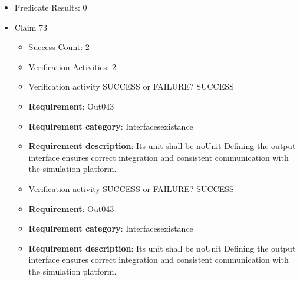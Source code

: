\documentclass{article}
\begin{document}
\begin{itemize}
\begin{itemize}
						\item \textbf{Requirement}: Out042 
						\item \textbf{Requirement category}: Interfacesexistance 
						\item \textbf{Requirement description}: Its unit shall be noUnit Defining the output interface ensures correct integration and consistent communication with the simulation platform.
					
					\item Verification activity SUCCESS or FAILURE? FAILURE
		
						\item \textbf{Requirement}: Out042 
						\item \textbf{Requirement category}: Interfacesexistance 
						\item \textbf{Requirement description}: Its unit shall be noUnit Defining the output interface ensures correct integration and consistent communication with the simulation platform.
					
				\end{itemize}
				
									    
				\item Predicate Results: 0

  				  \item Claim 73
				\begin{itemize}
			    	\item Success Count: 2 
			    	\item Verification Activities: 2
					\item Verification activity SUCCESS or FAILURE? SUCCESS
		
						\item \textbf{Requirement}: Out043 
						\item \textbf{Requirement category}: Interfacesexistance 
						\item \textbf{Requirement description}: Its unit shall be noUnit Defining the output interface ensures correct integration and consistent communication with the simulation platform.
					
					\item Verification activity SUCCESS or FAILURE? SUCCESS
		
						\item \textbf{Requirement}: Out043 
						\item \textbf{Requirement category}: Interfacesexistance 
						\item \textbf{Requirement description}: Its unit shall be noUnit Defining the output interface ensures correct integration and consistent communication with the simulation platform.
					

\end{itemize}
\end{itemize}
\end{document}
